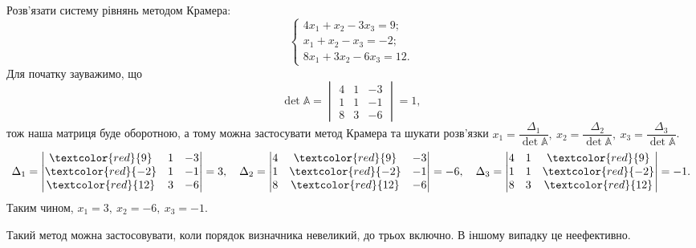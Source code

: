 \documentclass{math_library}
\begin{document}
\begin{example}
Розв'язати систему рівнянь методом Крамера:
\[
\begin{cases}
4x_1 + x_2 - 3x_3 = 9; \\
x_1 + x_2 - x_3 = -2; \\
8x_1 + 3x_2 - 6x_3 = 12.
 \end{cases}
 \]
Для початку зауважимо, що 
\[
\det \mathbb{A} = \begin{vmatrix}
 4 & 1 & - 3\\
 1 & 1 & - 1 \\
 8 & 3 & - 6
 \end{vmatrix} = 1,
\]
тож наша матриця буде оборотною, а тому можна застосувати метод Крамера та шукати розв'язки $x_1 = \dfrac{\Delta_1}{\det \mathbb{A}},\ x_2 = \dfrac{\Delta_2}{\det \mathbb{A}},\ x_3 = \dfrac{\Delta_3}{\det \mathbb{A}}$.
\begin{align*}
\Delta_1 = \begin{vmatrix}
 \textcolor{red}{9} & 1 & - 3\\
 \textcolor{red}{-2} & 1 & - 1 \\
 \textcolor{red}{12} & 3 & - 6
\end{vmatrix} = 3, \quad \Delta_2 = \begin{vmatrix}
 4 & \textcolor{red}{9} & - 3\\
 1 & \textcolor{red}{-2} & - 1 \\
 8 & \textcolor{red}{12} & - 6
\end{vmatrix} = -6, \quad \Delta_3 = \begin{vmatrix}
 4 & 1 & \textcolor{red}{9} \\
 1 & 1 & \textcolor{red}{-2} \\
 8 & 3 & \textcolor{red}{12}
\end{vmatrix} = -1.
\end{align*}
Таким чином, $x_1 = 3,\ x_2 = -6,\ x_3 = -1$.
\end{example}

\begin{remark}
Такий метод можна застосовувати, коли порядок визначника невеликий, до трьох включно. В іншому випадку це неефективно.
\end{remark}
\end{document}
